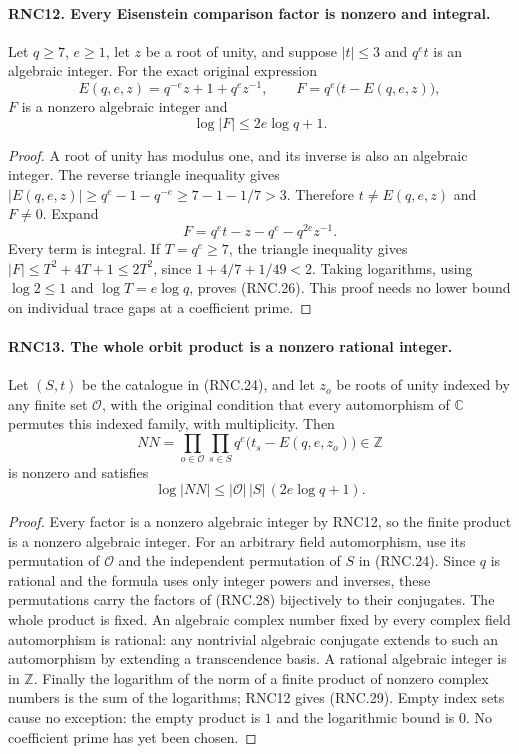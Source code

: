 \documentclass[11pt,a4paper]{article}
\numberwithin{equation}{section}
\theoremstyle{remark}\newtheorem{remark}[theorem]{Remark}
\begin{document}
\paragraph{RNC12. Every Eisenstein comparison factor is nonzero and integral.}
\label{claim:RNC12}
Let $q\geq7$, $e\geq1$, let $z$ be a root of unity,
and suppose $|t|\leq3$ and $q^e t$ is an algebraic integer.
For the exact original expression
\[
 E(q,e,z)=q^{-e}z+1+q^e z^{-1},\qquad
              F=q^e\bigl(t-E(q,e,z)\bigr),                    \tag{RNC.25}
\]
$F$ is a nonzero algebraic integer and
\[
                         \log|F|\leq2e\log q+1.
                                                               \tag{RNC.26}
\]
\begin{proof}
A root of unity has modulus one, and its inverse is also
an algebraic integer.  The reverse triangle inequality
gives
$|E(q,e,z)|\geq q^e-1-q^{-e}\geq7-1-1/7>3$.
Therefore $t\ne E(q,e,z)$ and $F\ne0$.
Expand
\[
             F=q^e t-z-q^e-q^{2e}z^{-1}.                      \tag{RNC.27}
\]
Every term is integral.  If $T=q^e\geq7$, the triangle
inequality gives
$|F|\leq T^2+4T+1\leq2T^2$, since
$1+4/7+1/49<2$.  Taking logarithms, using
$\log2\leq1$ and $\log T=e\log q$, proves (RNC.26).
This proof needs no lower bound on individual trace gaps
at a coefficient prime.
\end{proof}

\paragraph{RNC13. The whole orbit product is a nonzero rational integer.}
\label{claim:RNC13}
Let $(S,t)$ be the catalogue in (RNC.24), and let
$z_o$ be roots of unity indexed by any finite set $\mathcal O$,
with the original condition that every automorphism of
$\mathbb C$ permutes this indexed family, with multiplicity.
Then
\[
       NN=\prod_{o\in\mathcal O}\prod_{s\in S}
                   q^e\bigl(t_s-E(q,e,z_o)\bigr)\in\mathbb Z
                                                               \tag{RNC.28}
\]
is nonzero and satisfies
\[
      \log|NN|\leq |\mathcal O|\,|S|\,(2e\log q+1).
                                                               \tag{RNC.29}
\]
\begin{proof}
Every factor is a nonzero algebraic integer by RNC12, so
the finite product is a nonzero algebraic integer.  For
an arbitrary field automorphism, use its permutation of
$\mathcal O$ and the independent permutation of $S$ in
(RNC.24).  Since $q$ is rational and the formula uses only
integer powers and inverses, these permutations carry
the factors of (RNC.28) bijectively to their conjugates.
The whole product is fixed.  An algebraic complex number
fixed by every complex field automorphism is rational:
any nontrivial algebraic conjugate extends to such an
automorphism by extending a transcendence basis.  A
rational algebraic integer is in $\mathbb Z$.
Finally the logarithm of the norm of a finite product
of nonzero complex numbers is the sum of the logarithms;
RNC12 gives (RNC.29).  Empty index sets cause no exception:
the empty product is $1$ and the logarithmic bound is $0$.
No coefficient prime has yet been chosen.
\end{proof}
\end{document}
